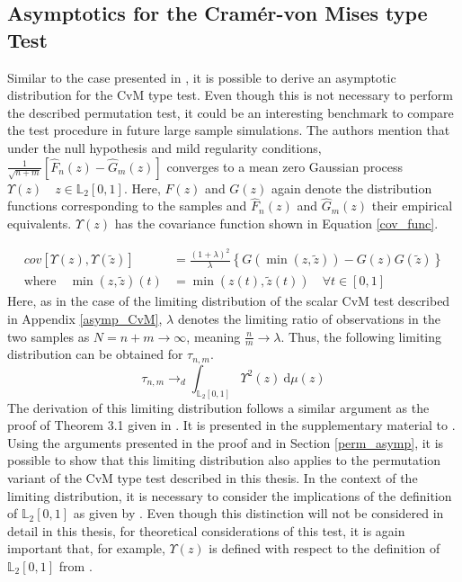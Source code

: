 \documentclass[12pt, a4paper]{article}
\theoremstyle{MAstyle} \newtheorem{assumption}{Assumption}[section]
\theoremstyle{MAstyle} \newtheorem{definition}{Definition}[section]
\theoremstyle{MAstyle} \newtheorem{theorem}{Theorem}[section]
\begin{document}
		\subsection{Asymptotics for the Cram\'{e}r-von Mises type Test}\label{asymp}
			Similar to the case presented in \cite{bugni_goodness--fit_2009}, it is possible to derive an asymptotic distribution for the CvM type test. Even though this is not necessary to perform the described permutation test, it could be an interesting benchmark to compare the test procedure in future large sample simulations. The authors mention that under the null hypothesis and mild regularity conditions, $\frac{1}{\sqrt{n+m}}\left[\hat{F}_n(z) - \hat{G}_m(z)\right]$ converges to a mean zero Gaussian process $\Upsilon(z) \quad z \in \mathbb{L}_2[0,1]$. Here, $F(z)$ and $G(z)$ again denote the distribution functions corresponding to the samples and $\hat{F}_n(z)$ and $\hat{G}_m(z)$ their empirical equivalents. $\Upsilon(z)$ has the covariance function shown in Equation \ref{cov_func}. 
			
			\begin{equation}\label{cov_func}
				\begin{split}
					\textit{cov}\left[\Upsilon(z), \Upsilon(\tilde{z})\right] &= \frac{(1 + \lambda)^2}{\lambda}\left\{G(\min\left(z, \tilde{z}\right)) - G(z)G(\tilde{z})\right\} \\
					\text{where} \quad \min(z, \tilde{z})(t) &= \min\left(z(t), \tilde{z}(t)\right) \quad \forall t \in [0,1]
				\end{split}
			\end{equation}
			Here, as in the case of the limiting distribution of the scalar CvM test described in Appendix \ref{asymp_CvM}, $\lambda$ denotes the limiting ratio of observations in the two samples as $N = n+m \rightarrow \infty$, meaning $\frac{n}{m} \rightarrow \lambda$. 
			Thus, the following limiting distribution can be obtained for $\tau_{n,m}$.
			\begin{equation}
				\tau_{n,m} \rightarrow_d \int_{\mathbb{L}_2[0,1]}\Upsilon^2(z) \ \mathrm{d}\mu(z)
			\end{equation}
			The derivation of this limiting distribution follows a similar argument as the proof of Theorem 3.1 given in \cite{bugni_goodness--fit_2009}. It is presented in the supplementary material to \cite{bugni_permutation_2021}.
			Using the arguments presented in the proof and in Section \ref{perm_asymp}, it is possible to show that this limiting distribution also applies to the permutation variant of the CvM type test described in this thesis.
			In the context of the limiting distribution, it is necessary to consider the implications of the definition of $\mathbb{L}_2[0,1]$ as given by \cite{bugni_permutation_2021}. Even though this distinction will not be considered in detail in this thesis, for theoretical considerations of this test, it is again important that, for example, $\Upsilon(z)$ is defined with respect to the definition of $\mathbb{L}_2[0,1]$ from \cite{bugni_permutation_2021}.
		
\end{document}
